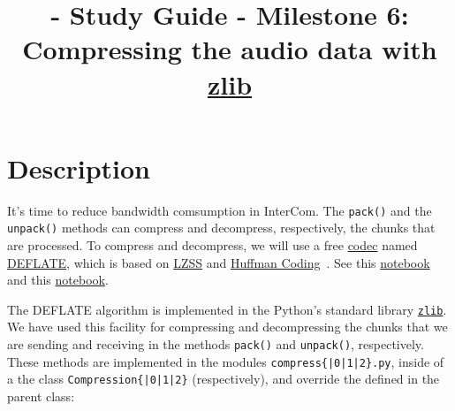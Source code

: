 
\title{\TM{} - Study Guide - Milestone 6: Compressing the audio data with \href{https://zlib.net/}{zlib}}

\maketitle

\section{Description}

It's time to reduce bandwidth comsumption in InterCom. The
\verb|pack()| and the \verb|unpack()| methods can compress and
decompress, respectively, the chunks that are processed. To compress
and decompress, we will use a free
\href{https://en.wikipedia.org/wiki/Codec}{codec} named
\href{https://en.wikipedia.org/wiki/DEFLATE}{DEFLATE}, which is based
on
\href{https://en.wikipedia.org/wiki/Lempel%E2%80%93Ziv%E2%80%93Storer%E2%80%93Szymanski}{LZSS}
  and \href{https://en.wikipedia.org/wiki/Huffman_coding}{Huffman
    Coding}~\cite{nelson96datacompression}. See this
  \href{https://github.com/vicente-gonzalez-ruiz/LZ77}{notebook} and
  this
  \href{https://vicente-gonzalez-ruiz.github.io/Huffman_coding/}{notebook}.

The DEFLATE algorithm is implemented in the Python's standard library
\href{https://docs.python.org/3/library/zlib.html}{\texttt{zlib}}. We
have used this facility for compressing and decompressing the chunks
that we are sending and receiving in the methods \verb|pack()| and
\verb|unpack()|, respectively. These methods are implemented in the
modules \texttt{compress\{|0|1|2\}.py}, inside of a the class
\texttt{Compression\{|0|1|2\}} (respectively), and
override the defined in the parent class:

